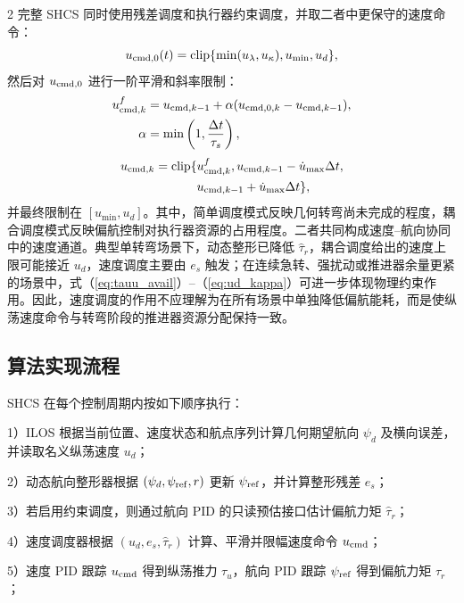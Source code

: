 \documentclass[authordraft]{ctacn}
\begin{document}
\begin{multicols}{2}
完整 SHCS 同时使用残差调度和执行器约束调度，并取二者中更保守的速度命令：
\begin{equation}
u_{{\rm cmd},0}(t)=\mathrm{clip}\{\min(u_{\lambda},u_{\kappa}),
u_{\min},u_d\},
\label{eq:ud_final}
\end{equation}
然后对 $u_{{\rm cmd},0}$ 进行一阶平滑和斜率限制：
\begin{equation}
\begin{aligned}
u_{{\rm cmd},k}^{f}
&=u_{{\rm cmd},k-1}
+\alpha(u_{{\rm cmd},0,k}-u_{{\rm cmd},k-1}),\\
\alpha&=\min\left(1,\frac{\Delta t}{\tau_s}\right),
\end{aligned}
\end{equation}
\begin{equation}
\begin{aligned}
u_{{\rm cmd},k}
=\mathrm{clip}\{&u_{{\rm cmd},k}^{f},
u_{{\rm cmd},k-1}-\dot u_{\max}\Delta t,\\
&u_{{\rm cmd},k-1}+\dot u_{\max}\Delta t\},
\end{aligned}
\end{equation}
并最终限制在 $[u_{\min},u_d]$。其中，简单调度模式反映几何转弯尚未完成的程度，耦合调度模式反映偏航控制对执行器资源的占用程度。二者共同构成速度–航向协同中的速度通道。典型单转弯场景下，动态整形已降低 $\hat{\tau}_r$，耦合调度给出的速度上限可能接近 $u_d$，速度调度主要由 $e_s$ 触发；在连续急转、强扰动或推进器余量更紧的场景中，式（\ref{eq:tauu_avail}）--（\ref{eq:ud_kappa}）可进一步体现物理约束作用。因此，速度调度的作用不应理解为在所有场景中单独降低偏航能耗，而是使纵荡速度命令与转弯阶段的推进器资源分配保持一致。

\subsection{算法实现流程}
SHCS 在每个控制周期内按如下顺序执行：

1）ILOS 根据当前位置、速度状态和航点序列计算几何期望航向 $\psi_d$ 及横向误差，并读取名义纵荡速度 $u_d$；

2）动态航向整形器根据 $(\psi_d,\psi_{\rm ref},r)$ 更新 $\psi_{\rm ref}$，并计算整形残差 $e_s$；

3）若启用约束调度，则通过航向 PID 的只读预估接口估计偏航力矩 $\hat{\tau}_r$；

4）速度调度器根据 $(u_d,e_s,\hat{\tau}_r)$ 计算、平滑并限幅速度命令 $u_{\rm cmd}$；

5）速度 PID 跟踪 $u_{\rm cmd}$ 得到纵荡推力 $\tau_u$，航向 PID 跟踪 $\psi_{\rm ref}$ 得到偏航力矩 $\tau_r$；


\end{multicols}
\end{document}
